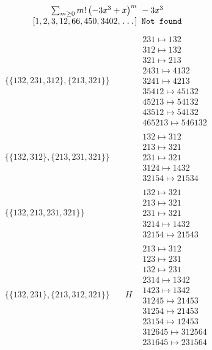 \begin{tiny}
$$\begin{matrix}
\sum_{m \geq 0} m! \left(
-3 x^{3} + x
\right)^m
\ 
-3 x^{3}
\\
\left[1, 2, 3, 12, 66, 450, 3402, \text{\texttt{...}}\right]
\ 
\texttt{Not found}
\end{matrix}
$$
\vspace{-1em}
\begin{align}
\{\{132, 231, 312\}, \{213, 321\}\}
\quad
&
\phantom{.}
&
\begin{matrix}
231 \mapsto 132\\312 \mapsto 132\\321 \mapsto 213\\2431 \mapsto 4132\\3241 \mapsto 4213\\35412 \mapsto 45132\\45213 \mapsto 54132\\43512 \mapsto 54132\\465213 \mapsto 546132
\end{matrix}
\\
\{\{132, 312\}, \{213, 231, 321\}\}
\quad
&
\phantom{.}
&
\begin{matrix}
132 \mapsto 312\\213 \mapsto 321\\231 \mapsto 321\\3124 \mapsto 1432\\32154 \mapsto 21534
\end{matrix}
\\
\{\{132, 213, 231, 321\}\}
\quad
&
\phantom{.}
&
\begin{matrix}
132 \mapsto 321\\213 \mapsto 321\\231 \mapsto 321\\3214 \mapsto 1432\\32154 \mapsto 21543
\end{matrix}
\\
\{\{132, 231\}, \{213, 312, 321\}\}
\quad
&
H
&
\begin{matrix}
213 \mapsto 312\\123 \mapsto 231\\132 \mapsto 231\\2314 \mapsto 1342\\1423 \mapsto 1342\\31245 \mapsto 21453\\31254 \mapsto 21453\\23154 \mapsto 12453\\312645 \mapsto 312564\\231645 \mapsto 231564

\end{matrix}
\end{align}
\end{tiny}
